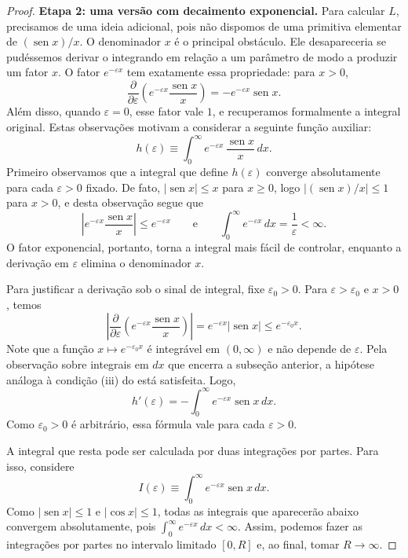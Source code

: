 \documentclass[12pt,portuguese]{article}
\theoremstyle{definition}
\theoremstyle{plainexercise}
\theoremstyle{starredexercise}
\theoremstyle{definition}
\renewcommand{\sin}{\operatorname{sen}}
\begin{document}
\begin{proof}
\smallskip
\noindent\textbf{Etapa 2: uma versão com decaimento exponencial.}
Para calcular $L$, precisamos de uma ideia adicional, pois não dispomos de
uma primitiva elementar de $(\sin x)/x$. O denominador $x$ é o principal
obstáculo. Ele desapareceria se pudéssemos derivar o integrando em relação a
um parâmetro de modo a produzir um fator $x$. O fator $e^{-\varepsilon x}$
tem exatamente essa propriedade: para $x>0$,
\[
\frac{\partial}{\partial\varepsilon}
\left(e^{-\varepsilon x}\frac{\sin x}{x}\right)
=
-e^{-\varepsilon x}\sin x .
\]
Além disso, quando $\varepsilon=0$, esse fator vale $1$, e recuperamos
formalmente a integral original. Estas observações motivam a considerar a 
seguinte função auxiliar:
\[
h(\varepsilon)\equiv \int_0^\infty e^{-\varepsilon x}\,\frac{\sin x}{x}\,dx .
\]
Primeiro observamos que a integral que define $h(\varepsilon)$ 
converge absolutamente para cada $\varepsilon>0$ fixado. 
De fato, $|\sin x|\leqslant x$ para
$x\geqslant0$, logo $|(\sin x)/x|\leqslant1$ para $x>0$, e desta observação segue que
\[
\left|e^{-\varepsilon x}\frac{\sin x}{x}\right|
\leqslant e^{-\varepsilon x}
\qquad \text{e}\qquad 
\int_0^\infty e^{-\varepsilon x}\,dx=\frac{1}{\varepsilon}<\infty .
\]
O fator exponencial, portanto, torna a integral mais fácil de controlar,
enquanto a derivação em $\varepsilon$ elimina o denominador $x$.

Para justificar a derivação sob o sinal de integral, fixe
$\varepsilon_0>0$. Para $\varepsilon>\varepsilon_0$ e $x>0$, temos
\[
\left|
\frac{\partial}{\partial\varepsilon}
\left(e^{-\varepsilon x}\frac{\sin x}{x}\right)
\right|
=
e^{-\varepsilon x}|\sin x|
\leqslant
e^{-\varepsilon_0 x}.
\]
Note que a função $x\longmapsto e^{-\varepsilon_0 x}$ é integrável em $(0,\infty)$ e não
depende de $\varepsilon$. Pela observação sobre integrais em $dx$ que
encerra a subseção anterior, a hipótese análoga à condição (iii) do
 está satisfeita. Logo,
\[
h'(\varepsilon)
=
-\int_0^\infty e^{-\varepsilon x}\sin x\,dx .
\]
Como $\varepsilon_0>0$ é arbitrário, essa fórmula vale para cada
$\varepsilon>0$.

A integral que resta pode ser calculada por duas integrações por partes.
Para isso, considere
\[
I(\varepsilon)\equiv\int_0^\infty e^{-\varepsilon x}\sin x\,dx .
\]
Como $|\sin x|\leqslant1$ e $|\cos x|\leqslant1$, todas as integrais que
aparecerão abaixo convergem absolutamente, pois
$\int_0^\infty e^{-\varepsilon x}\,dx<\infty$. Assim, podemos fazer as
integrações por partes no intervalo limitado $[0,R]$ e, ao final, tomar
$R\to\infty$.


\end{proof}
\end{document}
